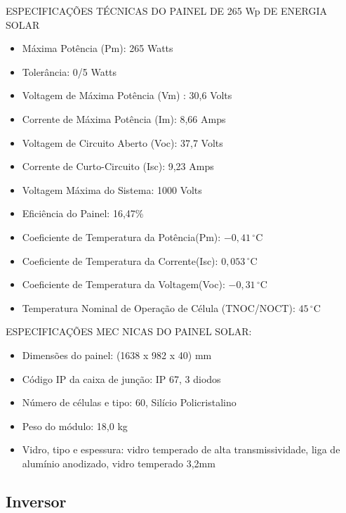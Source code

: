 ESPECIFICAÇÕES TÉCNICAS DO PAINEL DE 265 Wp DE ENERGIA SOLAR

\begin{itemize}
\item Máxima Potência (Pm):	265 Watts
\item Tolerância: 0/5 Watts
\item Voltagem de Máxima Potência (Vm) : 30,6 Volts
\item Corrente de Máxima Potência (Im): 8,66 Amps
\item Voltagem de Circuito Aberto (Voc): 37,7 Volts
\item Corrente de Curto-Circuito (Isc): 9,23 Amps
\item Voltagem Máxima do Sistema: 1000 Volts
\item Eficiência do Painel: 16,47\%
\item Coeficiente de Temperatura da Potência(Pm):  $-0,41\,^{\circ}\mathrm{C}$
\item Coeficiente de Temperatura da Corrente(Isc): $0,053\,^{\circ}\mathrm{C}$
\item Coeficiente de Temperatura da Voltagem(Voc): $-0,31\,^{\circ}\mathrm{C}$
\item Temperatura Nominal de Operação de Célula (TNOC/NOCT):   $45\,^{\circ}\mathrm{C}$
\end{itemize}
ESPECIFICAÇÕES MEC NICAS DO PAINEL SOLAR:
\begin{itemize}
\item Dimensões do painel: (1638 x 982 x 40) mm
\item Código IP da caixa de junção: IP 67, 3 diodos
\item Número de células e tipo:  60, Silício Policristalino
\item Peso do módulo: 18,0 kg
\item Vidro, tipo e espessura: vidro temperado de alta transmissividade, liga de alumínio anodizado, vidro temperado 3,2mm
\end{itemize}

\subsection{Inversor}

